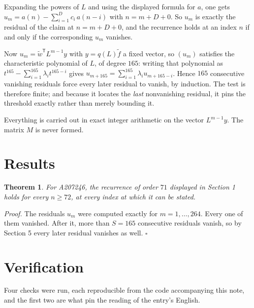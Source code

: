 \documentclass[11pt]{article}
\newtheorem{theorem}{Theorem}
\theoremstyle{definition}
\begin{document}
Expanding the powers of $L$ and using the displayed formula for $a$, one gets $u_m = a(n) - \sum_{i=1}^{D} c_i\,a(n-i)$ with $n = m + D + 0$. So $u_m$ is exactly the residual of the claim at $n = m + D + 0$, and the recurrence holds at an index $n$ if and only if the corresponding $u_m$ vanishes.

Now $u_m = \tilde w^{\mathsf T} L^{m-1} y$ with $y = q(L)\tilde f$ a fixed vector, so $(u_m)$ satisfies the characteristic polynomial of $L$, of degree $165$: writing that polynomial as $t^{165} - \sum_{i=1}^{165} \lambda_i t^{165-i}$ gives $u_{m+165} = \sum_{i=1}^{165} \lambda_i u_{m+165-i}$. Hence $165$ consecutive vanishing residuals force every later residual to vanish, by induction. The test is therefore finite; and because it locates the {\itshape last} nonvanishing residual, it pins the threshold exactly rather than merely bounding it.

Everything is carried out in exact integer arithmetic on the vector $L^{m-1}y$. The matrix $M$ is never formed.

\section{Results}

\begin{theorem} For A207246, the recurrence of order $71$ displayed in Section 1 holds for every $n \ge 72$, at every index at which it can be stated.\end{theorem}

{\itshape Proof.} The residuals $u_m$ were computed exactly for $m = 1,\dots,264$. Every one of them vanished. After it, more than $S = 165$ consecutive residuals vanish, so by Section 5 every later residual vanishes as well. $\square$

\section{Verification}

Four checks were run, each reproducible from the code accompanying this note, and the first two are what pin the reading of the entry's English.
\end{document}
